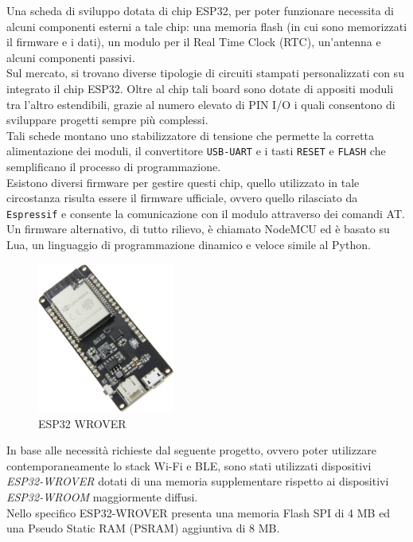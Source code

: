 \noindent Una scheda di sviluppo dotata di chip ESP32, per poter funzionare necessita di alcuni componenti esterni a tale chip: una memoria flash (in cui sono memorizzati il firmware e i dati), un modulo per il Real Time Clock (RTC), un'antenna e alcuni componenti passivi.\\
Sul mercato, si trovano diverse tipologie di circuiti stampati personalizzati con su integrato il chip ESP32. Oltre al chip tali board sono dotate di appositi moduli tra l'altro estendibili, grazie al numero elevato di PIN I/O i quali consentono di sviluppare progetti sempre più complessi.\\
Tali schede montano uno stabilizzatore di tensione che permette la corretta alimentazione dei moduli, il convertitore \texttt{USB-UART} e i tasti \texttt{RESET} e \texttt{FLASH} che semplificano il processo di programmazione. \\
Esistono diversi firmware per gestire questi chip, quello utilizzato in tale circostanza risulta essere il firmware ufficiale, ovvero quello rilasciato da \texttt{Espressif} e consente la comunicazione con il modulo attraverso dei comandi AT. %
Un firmware alternativo, di tutto rilievo, è chiamato NodeMCU ed è basato su Lua, un linguaggio di programmazione dinamico e veloce simile al Python.

\begin{figure}[!ht]
    \centering
    \includegraphics[width = 0.4\textwidth]{images/esp32_wrover.png}
    \caption{ESP32 WROVER}
    \label{fig:esp32_wrover}
\end{figure}

\noindent In base alle necessità richieste dal seguente progetto, ovvero poter utilizzare contemporaneamente lo stack Wi-Fi e BLE, sono stati utilizzati dispositivi \textit{ESP32-WROVER} dotati di una memoria supplementare rispetto ai dispositivi \textit{ESP32-WROOM} maggiormente diffusi.\\
Nello specifico ESP32-WROVER presenta una memoria Flash SPI di 4 MB ed una Pseudo Static RAM (PSRAM) aggiuntiva di 8 MB.

